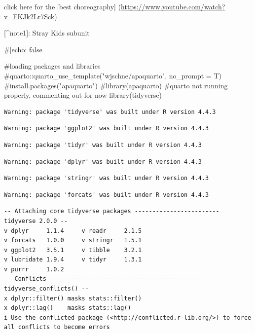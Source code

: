 \documentclass[
  letterpaper,
  DIV=11,
  numbers=noendperiod]{scrartcl}
\newenvironment{Shaded}{\begin{snugshade}}{\end{snugshade}}
\newcommand{\CommentTok}[1]{\textcolor[rgb]{0.37,0.37,0.37}{#1}}
\newcommand{\FunctionTok}[1]{\textcolor[rgb]{0.28,0.35,0.67}{#1}}
\newcommand{\NormalTok}[1]{\textcolor[rgb]{0.00,0.23,0.31}{#1}}
\begin{document}
click here for the {[}best choreography{]}
(\url{https://www.youtube.com/watch?v=FKJk2Lr7Sck})

{[}\^{}note1{]}: Stray Kids subunit

\begin{Shaded}
\begin{Highlighting}[]
\CommentTok{\#|echo: false}

\CommentTok{\#loading packages and libraries}
\CommentTok{\#quarto::quarto\_use\_template("wjschne/apaquarto", no\_prompt = T)}
\CommentTok{\#install.packages("apaquarto")}
\CommentTok{\#library(apaquarto)}
\CommentTok{\#quarto not running properly, commenting out for now}
\FunctionTok{library}\NormalTok{(tidyverse)}
\end{Highlighting}
\end{Shaded}

\begin{verbatim}
Warning: package 'tidyverse' was built under R version 4.4.3
\end{verbatim}

\begin{verbatim}
Warning: package 'ggplot2' was built under R version 4.4.3
\end{verbatim}

\begin{verbatim}
Warning: package 'tidyr' was built under R version 4.4.3
\end{verbatim}

\begin{verbatim}
Warning: package 'dplyr' was built under R version 4.4.3
\end{verbatim}

\begin{verbatim}
Warning: package 'stringr' was built under R version 4.4.3
\end{verbatim}

\begin{verbatim}
Warning: package 'forcats' was built under R version 4.4.3
\end{verbatim}

\begin{verbatim}
-- Attaching core tidyverse packages ------------------------ tidyverse 2.0.0 --
v dplyr     1.1.4     v readr     2.1.5
v forcats   1.0.0     v stringr   1.5.1
v ggplot2   3.5.1     v tibble    3.2.1
v lubridate 1.9.4     v tidyr     1.3.1
v purrr     1.0.2     
-- Conflicts ------------------------------------------ tidyverse_conflicts() --
x dplyr::filter() masks stats::filter()
x dplyr::lag()    masks stats::lag()
i Use the conflicted package (<http://conflicted.r-lib.org/>) to force all conflicts to become errors
\end{verbatim}
\end{document}
